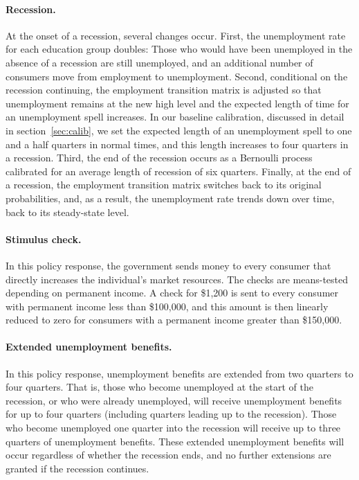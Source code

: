 \documentclass[\econtexRoot/HAFiscal]{subfiles}
\begin{document}
\paragraph{Recession.} At the onset of a recession, several changes occur. First, the unemployment rate for each education group doubles: Those who would have been unemployed in the absence of a recession are still unemployed, and an additional number of consumers move from employment to unemployment. Second, conditional on the recession continuing, the employment transition matrix is adjusted so that unemployment remains at the new high level and the expected length of time for an unemployment spell increases. In our baseline calibration, discussed in detail in section~\ref{sec:calib}, we set the expected length of an unemployment spell to one and a half quarters in normal times, and this length increases to four quarters in a recession. Third, the end of the recession occurs as a Bernoulli process calibrated for an average length of recession of six quarters. Finally, at the end of a recession, the employment transition matrix switches back to its original probabilities, and, as a result, the unemployment rate trends down over time, back to its steady-state level.

\paragraph{Stimulus check.} In this policy response, the government sends money to every consumer that directly increases the individual's market resources. The checks are means-tested depending on permanent income. A check for \$1,200 is sent to every consumer with permanent income less than \$100,000, and this amount is then linearly reduced to zero for consumers with a permanent income greater than \$150,000.

\paragraph{Extended unemployment benefits.} In this policy response, unemployment benefits are extended from two quarters to four quarters. That is, those who become unemployed at the start of the recession, or who were already unemployed, will receive unemployment benefits for up to four quarters (including quarters leading up to the recession). Those who become unemployed one quarter into the recession will receive up to three quarters of unemployment benefits. These extended unemployment benefits will occur regardless of whether the recession ends, and no further extensions are granted if the recession continues.
\end{document}

